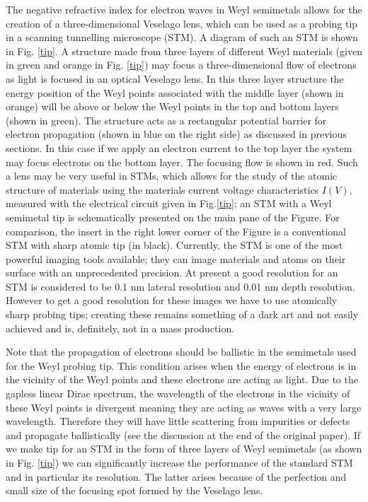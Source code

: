 \documentclass[prb,twocolumn,aps,superscriptaddress,showpacs,floatfix]{revtex4}
\begin{document}
	The negative refractive index for electron waves in Weyl semimetals allows for the creation of a three-dimensional Veselago lens, which can be used as a probing tip in a scanning tunnelling microscope (STM). A diagram of such an STM is shown in Fig. \ref{tip}. A structure made from three layers of different Weyl materials (given in green and orange in Fig. \ref{tip}) may focus a three-dimensional flow of electrons as light is focused in an optical Veselago lens. In this three layer structure the energy position of the Weyl points associated with the middle layer (shown in orange) will be above or below the Weyl points in the top and bottom layers (shown in green). The structure acts as a rectangular potential barrier for electron propagation (shown in blue on the right side) as discussed in previous sections. In this case if  we apply an electron current to the top layer the system may focus electrons on the bottom layer. The focusing flow is shown in red. Such a lens may be very useful in STMs, which allows for the study of the atomic structure of materials using the materials current voltage characteristics $I(V)$, measured with the electrical circuit given in Fig.\ref{tip}; an STM with a Weyl semimetal tip is schematically presented on the main pane of the Figure. For comparison, the insert in the right lower corner of the Figure is a conventional STM with sharp atomic tip (in black). Currently, the STM is one of the most powerful imaging tools available; they can image materials and atoms on their surface with an unprecedented precision.  At present a good resolution for an STM is considered to be 0.1 nm lateral resolution and 0.01 nm depth resolution\cite{Bai}. However to get a good resolution for these images we have to use atomically sharp probing tips; creating these remains something of a dark art and not easily achieved and is, definitely, not in a mass production.
 		 
	Note that the propagation of electrons should be ballistic in the semimetals used for the Weyl probing tip. This condition arises when the energy of electrons is in the vicinity of the Weyl points and these electrons are acting as light. Due to the gapless linear Dirac spectrum, the wavelength of the electrons in the vicinity of these Weyl points is divergent meaning they are acting as waves with a very large wavelength. Therefore they will have little scattering from impurities or defects and propagate ballistically (see the discussion at the end of the original paper\cite{b2}). If we make tip for an STM in the form of three layers of Weyl semimetals (as shown in Fig. \ref{tip}) we can significantly increase the performance of the standard STM and in particular its resolution. The latter arises because of the perfection and small size of the focusing spot formed by the Veselago lens\cite{p1}.
\end{document}
